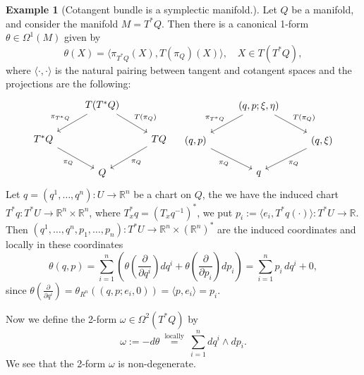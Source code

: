 \documentclass{article}
\theoremstyle{definition}
\newtheorem{example}[theorem]{Example}
\begin{document}
\begin{example}[Cotangent bundle is a symplectic manifold.]
    Let $Q$ be a manifold, and consider the manifold $M = T^*Q$. Then there is a canonical 1-form $\theta \in \Omega^1(M)$ given by 
    \begin{equation}\label{eqTheta1}
        \theta(X) =  \langle \pi_{T^*Q}(X) , T(\pi_Q)(X) \rangle , \quad X \in T(T^*Q),
    \end{equation}
    where $\langle \cdot , \cdot \rangle$ is the natural pairing between tangent and cotangent spaces and the projections are the following:
    \[
    \begin{tikzcd}
        & T(T^*Q) \arrow[ld, "\pi_{T^*Q}"'] \arrow[rd, "T(\pi_Q)"] & \\
        T^*Q \arrow[rd, "\pi_Q"'] & & TQ \arrow[ld, "\pi_Q"] \\
        & Q &
        \end{tikzcd}
        \quad
        \begin{tikzcd}
        & (q, p; \xi, \eta) \arrow[ld, "\pi_{T^*Q}"'] \arrow[rd, "T(\pi_Q)"] & \\
        (q, p) \arrow[rd, "\pi_Q"'] & & (q, \xi) \arrow[ld, "\pi_Q"] \\
        & q &
    \end{tikzcd}
    \]    
    Let $ q = (q^1, \ldots, q^n) : U \to \mathbb{R}^n$ be a chart on $Q$, the we have the induced chart $T^*q : T^*U \to \mathbb{R}^n \times \mathbb{R}^n$, where $T^*_x q = (T_x q^{-1})^*$, we put $p_i := \langle e_i , T^*q(\cdot) \rangle : T^*U \to \mathbb{R}$. Then $(q^1, \ldots, q^n, p_1, \ldots, p_n) : T^*U \to \mathbb{R}^n \times (\mathbb{R}^n)^*$ are the induced coordinates and locally in these coordinates 
    \begin{equation}\label{eqTheta2}
        \theta(q,p) = \sum_{i=1}^n \left( \theta \left( \frac{\partial}{\partial q^i} \right) dq^i + \theta \left( \frac{\partial}{\partial p_i} \right) dp_i \right) = \sum_{i=1}^n p_i \, dq^i + 0,
    \end{equation}
    since $\theta \left( \frac{\partial}{\partial q^i} \right) = \theta_{R^n} \left( (q,p;e_i,0) \right) = \langle p,e_i \rangle = p_i$.

    Now we define the 2-form $\omega \in \Omega^2(T^*Q)$ by 
    \begin{equation}\label{eqCotangentForm}
        \omega := -d \theta \stackrel{\text { locally }}{=} \sum_{i=1}^n d q^i \wedge d p_i.
    \end{equation}
    We see that the 2-form $\omega$ is non-degenerate.
\end{example}
\end{document}
